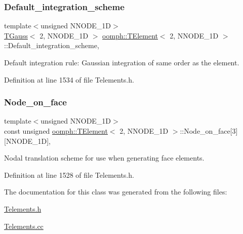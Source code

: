 \subsubsection{\texorpdfstring{Default\+\_\+integration\+\_\+scheme}{Default\_integration\_scheme}}
{\footnotesize\ttfamily template$<$unsigned N\+N\+O\+D\+E\+\_\+1D$>$ \\
\hyperlink{classoomph_1_1TGauss}{T\+Gauss}$<$ 2, N\+N\+O\+D\+E\+\_\+1D $>$ \hyperlink{classoomph_1_1TElement}{oomph\+::\+T\+Element}$<$ 2, N\+N\+O\+D\+E\+\_\+1D $>$\+::Default\+\_\+integration\+\_\+scheme\hspace{0.3cm}{\ttfamily [static]}, {\ttfamily [private]}}



Default integration rule\+: Gaussian integration of same \textquotesingle{}order\textquotesingle{} as the element. 



Definition at line 1534 of file Telements.\+h.

\mbox{\label{classoomph_1_1TElement_3_012_00_01NNODE__1D_01_4_a75b99450e2a11a5d6723f86defde1cc0}} 
\subsubsection{\texorpdfstring{Node\+\_\+on\+\_\+face}{Node\_on\_face}}
{\footnotesize\ttfamily template$<$unsigned N\+N\+O\+D\+E\+\_\+1D$>$ \\
const unsigned \hyperlink{classoomph_1_1TElement}{oomph\+::\+T\+Element}$<$ 2, N\+N\+O\+D\+E\+\_\+1D $>$\+::Node\+\_\+on\+\_\+face\mbox{[}3\mbox{]}\mbox{[}N\+N\+O\+D\+E\+\_\+1D\mbox{]}\hspace{0.3cm}{\ttfamily [static]}, {\ttfamily [private]}}



Nodal translation scheme for use when generating face elements. 



Definition at line 1528 of file Telements.\+h.



The documentation for this class was generated from the following files\+:\begin{DoxyCompactItemize}
\item 
\hyperlink{Telements_8h}{Telements.\+h}\item 
\hyperlink{Telements_8cc}{Telements.\+cc}\end{DoxyCompactItemize}

